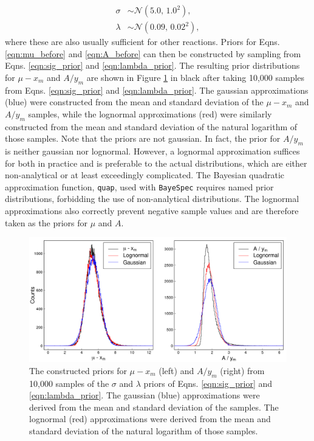 \begin{align} 
    \sigma &\sim \mathcal{N}(5.0, \, 1.0^{2}), \label{eqn:sig_prior} \\
    \lambda &\sim \mathcal{N}(0.09, \, 0.02^{2}), \label{eqn:lambda_prior}
\end{align} 
where these are also usually sufficient for other reactions. Priors for Eqns. \ref{eqn:mu_before} and \ref{eqn:A_before} can then be constructed by sampling from Eqns. \ref{eqn:sig_prior} and \ref{eqn:lambda_prior}. The resulting prior distributions for $\mu - x_{m}$ and $A / y_{m}$ are shown in Figure \ref{fig:mu_and_A} in black after taking 10,000 samples from Eqns. \ref{eqn:sig_prior} and \ref{eqn:lambda_prior}. The gaussian approximations (blue) were constructed from the mean and standard deviation of the $\mu - x_{m}$ and $A/y_{m}$ samples, while the lognormal approximations (red) were similarly constructed from the mean and standard deviation of the natural logarithm of those samples. Note that the priors are not gaussian. In fact, the prior for $A / y_{m}$ is neither gaussian nor lognormal. However, a lognormal approximation suffices for both in practice and is preferable to the actual distributions, which are either non-analytical or at least exceedingly complicated. The Bayesian quadratic approximation function, \texttt{quap}, used with \texttt{BayeSpec} requires named prior distributions, forbidding the use of non-analytical distributions. The lognormal approximations also correctly prevent negative sample values and are therefore taken as the priors for $\mu$ and $A$.

\begin{figure}[t]
\centering
\includegraphics[width=6.5in]{Chapter-6/figs/mu_and_A.png}
\caption{\label{fig:mu_and_A}The constructed priors for $\mu - x_{m}$ (left) and $A/y_{m}$ (right) from 10,000 samples of the $\sigma$ and $\lambda$ priors of Eqns. \ref{eqn:sig_prior} and \ref{eqn:lambda_prior}. The gaussian (blue) approximations were derived from the mean and standard deviation of the samples. The lognormal (red) approximations were derived from the mean and standard deviation of the natural logarithm of those samples.}
\end{figure}

